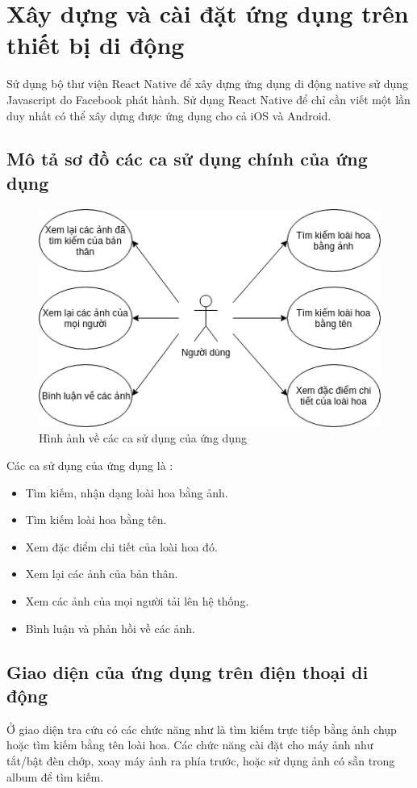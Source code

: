\documentclass[12pt]{report}
\begin{document}
		\section{Xây dựng và cài đặt ứng dụng trên thiết bị di động}
		Sử dụng bộ thư viện React Native để xây dựng ứng dụng di động native sử dụng Javascript do Facebook phát hành. Sử dụng React Native để chỉ cần viết một lần duy nhất có thể xây dựng được ứng dụng cho cả iOS và Android.
		\subsection{Mô tả sơ đồ các ca sử dụng chính của ứng dụng}
		
		\begin{figure}[h]
			\centering
			\includegraphics[scale=1]{usecase}
			\caption{Hình ảnh về các ca sử dụng của ứng dụng}
			\label{fig:usecase}
		\end{figure}
		Các ca sử dụng của ứng dụng là :

		\begin{itemize}
			\item Tìm kiếm, nhận dạng loài hoa bằng ảnh.
			\item Tìm kiếm loài hoa bằng tên.
			\item Xem đặc điểm chi tiết của loài hoa đó.
			\item Xem lại các ảnh của bản thân.
			\item Xem các ảnh của mọi người tải lên hệ thống.
			\item Bình luận và phản hồi về các ảnh.
		\end{itemize}

		\subsection{Giao diện của ứng dụng trên điện thoại di động}
		Ở giao diện tra cứu có các chức năng như là tìm kiếm trực tiếp bằng ảnh chụp hoặc tìm kiếm bằng tên loài hoa. Các chức năng cài đặt cho máy ảnh như tắt/bật đèn chớp, xoay máy ảnh ra phía trước, hoặc sử dụng ảnh có sẵn trong album để tìm kiếm.
\end{document}
